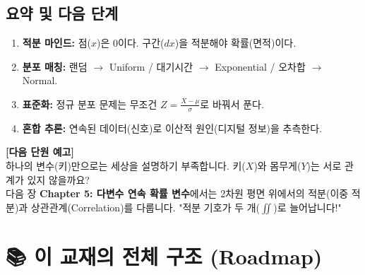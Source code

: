 \documentclass[11pt,a4paper]{book}
\theoremstyle{definition}
\begin{document}
\section{요약 및 다음 단계}

\begin{tcolorbox}[colback=mainblue!10, colframe=mainblue, title={\textbf{📝 Unit 2-1 핵심 요약}}]
\begin{enumerate}
    \item \textbf{적분 마인드:} 점($x$)은 0이다. 구간($dx$)을 적분해야 확률(면적)이다.
    \item \textbf{분포 매칭:} 랜덤 $\to$ Uniform / 대기시간 $\to$ Exponential / 오차합 $\to$ Normal.
    \item \textbf{표준화:} 정규 분포 문제는 무조건 $Z = \frac{X-\mu}{\sigma}$로 바꿔서 푼다.
    \item \textbf{혼합 추론:} 연속된 데이터(신호)로 이산적 원인(디지털 정보)을 추측한다.
\end{enumerate}
\end{tcolorbox}

\vspace{0.5cm}
\textbf{[다음 단원 예고]} \\
하나의 변수(키)만으로는 세상을 설명하기 부족합니다. 키($X$)와 몸무게($Y$)는 서로 관계가 있지 않을까요? \\
다음 장 \textbf{Chapter 5: 다변수 연속 확률 변수}에서는 2차원 평면 위에서의 적분(이중 적분)과 상관관계(Correlation)를 다룹니다. "적분 기호가 두 개($\iint$)로 늘어납니다!"


\chapter{📚 이 교재의 전체 구조 (Roadmap)}
\label{ch:lecture5}

\end{document}
